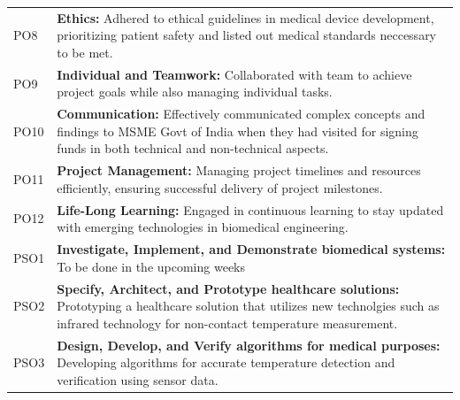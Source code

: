 \documentclass{article}
\begin{document}
\begin{table}[ht]
\begin{tabular}{@{}ll@{}}
        PO8  & \begin{minipage}[t]{10cm} \textbf{Ethics:} Adhered to ethical guidelines in medical device development, prioritizing patient safety and listed out medical standards neccessary to be met. \end{minipage} \\
        PO9  & \begin{minipage}[t]{10cm} \textbf{Individual and Teamwork:} Collaborated with team to achieve project goals while also managing individual tasks. \end{minipage} \\
        PO10 & \begin{minipage}[t]{10cm} \textbf{Communication:} Effectively communicated complex concepts and findings to MSME Govt of India when they had visited for signing funds in both technical and non-technical aspects. \end{minipage} \\
        PO11 & \begin{minipage}[t]{10cm} \textbf{Project Management:} Managing project timelines and resources efficiently, ensuring successful delivery of project milestones. \end{minipage} \\
        PO12 & \begin{minipage}[t]{10cm} \textbf{Life-Long Learning:} Engaged in continuous learning to stay updated with emerging technologies in biomedical engineering. \end{minipage} \\ \midrule
        PSO1 & \begin{minipage}[t]{10cm}\textbf{ Investigate, Implement, and Demonstrate biomedical systems:} To be done in the upcoming weeks \end{minipage} \\
        PSO2 & \begin{minipage}[t]{10cm} \textbf{Specify, Architect, and Prototype healthcare solutions:} Prototyping a healthcare solution that utilizes new technolgies such as infrared technology for non-contact temperature measurement. \end{minipage} \\
        PSO3 & \begin{minipage}[t]{10cm} \textbf{Design, Develop, and Verify algorithms for medical purposes:} Developing algorithms for accurate temperature detection and verification using sensor data. \end{minipage} \\ \bottomrule
    \end{tabular}
    \label{tab:outcomes}
\end{table}
\end{document}
